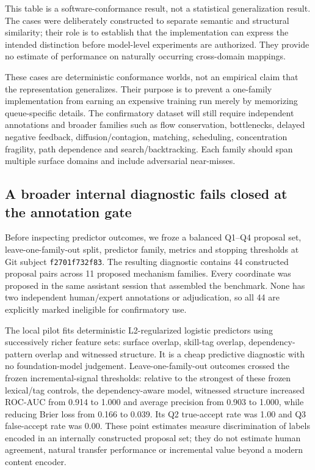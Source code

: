 This table is a software-conformance result, not a statistical generalization result. The cases were deliberately constructed to separate semantic and structural similarity; their role is to establish that the implementation can express the intended distinction before model-level experiments are authorized. They provide no estimate of performance on naturally occurring cross-domain mappings.

These cases are deterministic conformance worlds, not an empirical claim that the representation generalizes. Their purpose is to prevent a one-family implementation from earning an expensive training run merely by memorizing queue-specific details. The confirmatory dataset will still require independent annotations and broader families such as flow conservation, bottlenecks, delayed negative feedback, diffusion/contagion, matching, scheduling, concentration fragility, path dependence and search/backtracking. Each family should span multiple surface domains and include adversarial near-misses.

\subsection{A broader internal diagnostic fails closed at the annotation gate}

Before inspecting predictor outcomes, we froze a balanced Q1--Q4 proposal set, leave-one-family-out split, predictor family, metrics and stopping thresholds at Git subject \texttt{f2701f732f83}. The resulting diagnostic contains 44 constructed proposal pairs across 11 proposed mechanism families. Every coordinate was proposed in the same assistant session that assembled the benchmark. None has two independent human/expert annotations or adjudication, so all 44 are explicitly marked ineligible for confirmatory use.

The local pilot fits deterministic L2-regularized logistic predictors using successively richer feature sets: surface overlap, skill-tag overlap, dependency-pattern overlap and witnessed structure. It is a cheap predictive diagnostic with no foundation-model judgement. Leave-one-family-out outcomes crossed the frozen incremental-signal thresholds: relative to the strongest of these frozen lexical/tag controls, the dependency-aware model, witnessed structure increased ROC-AUC from 0.914 to 1.000 and average precision from 0.903 to 1.000, while reducing Brier loss from 0.166 to 0.039. Its Q2 true-accept rate was 1.00 and Q3 false-accept rate was 0.00. These point estimates measure discrimination of labels encoded in an internally constructed proposal set; they do not estimate human agreement, natural transfer performance or incremental value beyond a modern content encoder.

